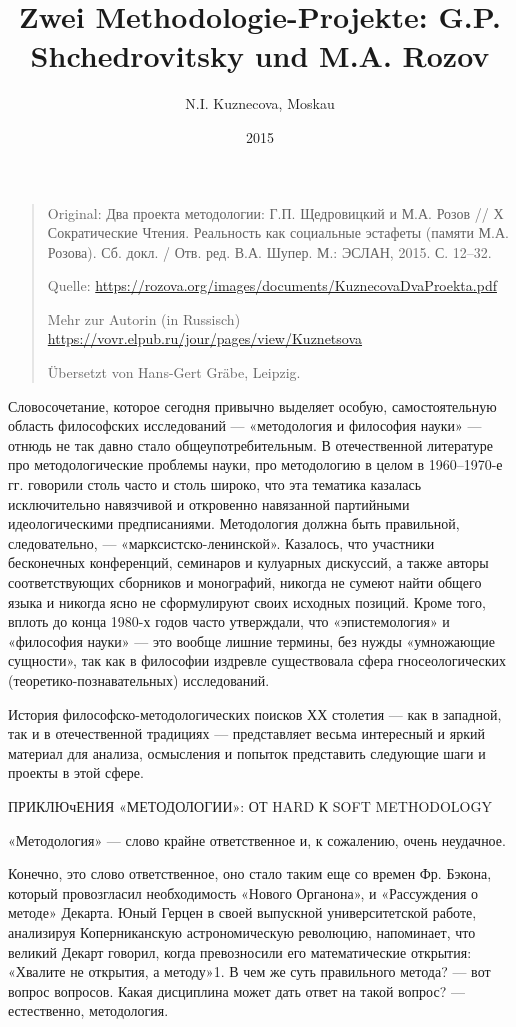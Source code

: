 \documentclass[11pt,a4paper]{article}
\title{Zwei Methodologie-Projekte: G.P. Shchedrovitsky und M.A. Rozov}
\author{N.I. Kuznecova, Moskau}
\date{2015}
\begin{document}
\maketitle
\begin{quote}
  Original: \foreignlanguage{russian}{ Два проекта методологии:
    Г.П. Щедровицкий и М.А. Розов // Х Сократические Чтения. Реальность как
    социальные эстафеты (памяти М.А. Розова). Сб. докл. /
    Отв. ред. В.А. Шупер. М.: ЭСЛАН, 2015. С. 12–32.}
  
  Quelle: \url{https://rozova.org/images/documents/KuznecovaDvaProekta.pdf}

  Mehr zur Autorin (in Russisch)
  \url{https://vovr.elpub.ru/jour/pages/view/Kuznetsova}

  Übersetzt von Hans-Gert Gräbe, Leipzig. 
\end{quote}

Словосочетание, которое сегодня привычно выделяет особую, самостоятельную
область философских исследований — «методология и философия науки» — отнюдь не
так давно стало общеупотребительным. В отечественной литературе про
методологические проблемы науки, про методологию в целом в 1960–1970-е
гг. говорили столь часто и столь широко, что эта тематика казалась
исключительно навязчивой и откровенно навязанной партийными идеологическими
предписаниями. Методология должна быть правильной, следовательно, —
«марксистско-ленинской». Казалось, что участники бесконечных конференций,
семинаров и кулуарных дискуссий, а также авторы соответствующих сборников и
монографий, никогда не сумеют найти общего языка и никогда ясно не
сформулируют своих исходных позиций. Кроме того, вплоть до конца 1980-х
годов часто утверждали, что «эпистемология» и «философия науки» — это вообще
лишние термины, без нужды «умножающие сущности», так как в философии издревле
существовала сфера гносеологических (теоретико-познавательных) исследований.

История философско-методологических поисков ХХ столетия — как в западной,
так и в отечественной традициях — представляет весьма интересный и яркий
материал для анализа, осмысления и попыток представить следующие шаги и
проекты в этой сфере.

ПРИКЛЮчЕНИЯ «МЕТОДОЛОГИИ»: ОТ HARD К SOFT METHODOLOGY

«Методология» — слово крайне ответственное и, к сожалению, очень неудачное.

Конечно, это слово ответственное, оно стало таким еще со времен Фр. Бэкона,
который провозгласил необходимость «Нового Органона», и «Рассуждения о
методе» Декарта. Юный Герцен в своей выпускной университетской работе,
анализируя Коперниканскую астрономическую революцию, напоминает, что великий
Декарт говорил, когда превозносили его математические открытия: «Хвалите не
открытия, а методу»1. В чем же суть правильного метода? — вот вопрос
вопросов. Какая дисциплина может дать ответ на такой вопрос? — естественно,
методология.
\end{document}
